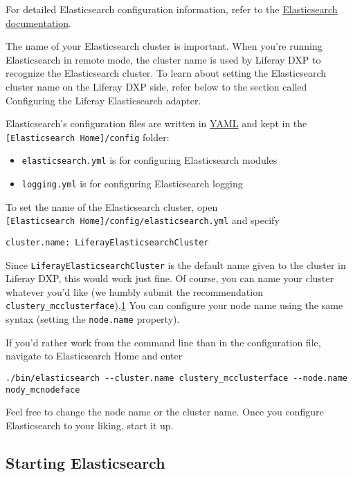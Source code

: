 For detailed Elasticsearch configuration information, refer to the
\href{https://www.elastic.co/guide/en/elasticsearch/reference/2.4/setup-configuration.html\#settings}{Elasticsearch
documentation}.

The name of your Elasticsearch cluster is important. When you're running
Elasticsearch in remote mode, the cluster name is used by Liferay DXP to
recognize the Elasticsearch cluster. To learn about setting the
Elasticsearch cluster name on the Liferay DXP side, refer below to the
section called Configuring the Liferay Elasticsearch adapter.

Elasticsearch's configuration files are written in
\href{http://www.yaml.org}{YAML} and kept in the
\texttt{{[}Elasticsearch\ Home{]}/config} folder:

\begin{itemize}
\tightlist
\item
  \texttt{elasticsearch.yml} is for configuring Elasticsearch modules
\item
  \texttt{logging.yml} is for configuring Elasticsearch logging
\end{itemize}

To set the name of the Elasticsearch cluster, open
\texttt{{[}Elasticsearch\ Home{]}/config/elasticsearch.yml} and specify

\begin{verbatim}
cluster.name: LiferayElasticsearchCluster
\end{verbatim}

Since \texttt{LiferayElasticsearchCluster} is the default name given to
the cluster in Liferay DXP, this would work just fine. Of course, you
can name your cluster whatever you'd like (we humbly submit the
recommendation \texttt{clustery\_mcclusterface}).\hyperref[footnote1]{1}
You can configure your node name using the same syntax (setting the
\texttt{node.name} property).

If you'd rather work from the command line than in the configuration
file, navigate to Elasticsearch Home and enter

\begin{verbatim}
./bin/elasticsearch --cluster.name clustery_mcclusterface --node.name nody_mcnodeface
\end{verbatim}

Feel free to change the node name or the cluster name. Once you
configure Elasticsearch to your liking, start it up.

\subsection{Starting Elasticsearch}\label{starting-elasticsearch}

